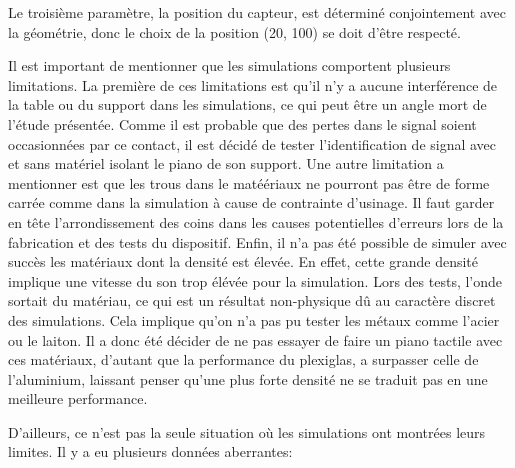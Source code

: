 \documentclass[conference]{IEEEtran}
\begin{document}
Le troisième paramètre, la position du capteur, est déterminé conjointement avec 
la géométrie, donc le choix de la position (20, 100) se doit d'être respecté. 

Il est important de mentionner que les simulations comportent plusieurs limitations.
La première de ces limitations est qu'il n'y a aucune interférence de la table ou 
du support dans les simulations, ce qui peut être un angle mort de l'étude présentée.
Comme il est probable que des pertes dans le signal soient occasionnées par ce
contact, il est décidé de tester l'identification de signal avec et sans matériel 
isolant le piano de son support. Une autre limitation a mentionner est que les trous
dans le matéériaux ne pourront pas être de forme carrée comme dans la simulation à 
cause de contrainte d'usinage. Il faut garder en tête l'arrondissement des coins dans
les causes potentielles d'erreurs lors de la fabrication et des tests du dispositif.
Enfin, il n'a pas été possible de simuler avec succès les matériaux dont la densité
est élevée. En effet, cette grande densité implique une vitesse du son trop élévée
pour la simulation. Lors des tests, l'onde sortait du matériau, ce qui est un résultat
non-physique dû au caractère discret des simulations. Cela implique qu'on n'a pas pu 
tester les métaux comme l'acier ou le laiton. Il a donc été décider de ne pas essayer
de faire un piano tactile avec ces matériaux, d'autant que la performance du plexiglas,
a surpasser celle de l'aluminium, laissant penser qu'une plus forte densité ne se 
traduit pas en une meilleure performance.

D'ailleurs, ce n'est pas la seule situation où les simulations ont montrées leurs 
limites. Il y a eu plusieurs données aberrantes: 

\clearpage

% 
% 
\end{document}
